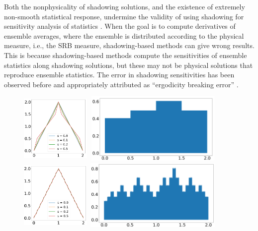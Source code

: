 \documentclass[preprint,12pt]{elsarticle}
\begin{document}
Both the nonphysicality of shadowing solutions, and the existence of extremely non-smooth statistical response, undermine the validity of using shadowing for sensitivity analysis of statistics \cite{qiqi-lss}\cite{angxiu-lss}\cite{lasagna}. When the goal is to compute derivatives of ensemble averages, where the ensemble
is distributed according to the physical measure, i.e., the SRB measure, shadowing-based methods can give wrong results. This is because shadowing-based methods compute the sensitivities of ensemble statistics along shadowing solutions, but these may not be physical solutions that reproduce ensemble statistics. The error in shadowing sensitivities has been observed
before and appropriately attributed as ``ergodicity breaking error'' \cite{patrick} \cite{angxiu-error}. 
\begin{figure}
    \centering
    \includegraphics[width=0.3\textwidth,height=1.35in]{osc_tent_0.png}
     \includegraphics[width=0.6\textwidth,height=1.35in]{osc_tent_dens_0.1_0.png}
    \includegraphics[width=0.3\textwidth,height=1.35in]{osc_tent_3.png}
     \includegraphics[width=0.6\textwidth,height=1.35in]{osc_tent_dens_0.1_3.png}

\end{figure}
\end{document}
